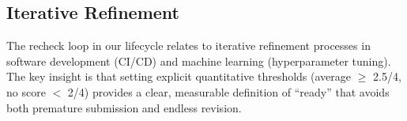 \subsection{Iterative Refinement}

The recheck loop in our lifecycle relates to iterative refinement processes in software development (CI/CD) and machine learning (hyperparameter tuning). The key insight is that setting explicit quantitative thresholds (average $\geq$ 2.5/4, no score $<$ 2/4) provides a clear, measurable definition of ``ready'' that avoids both premature submission and endless revision.
